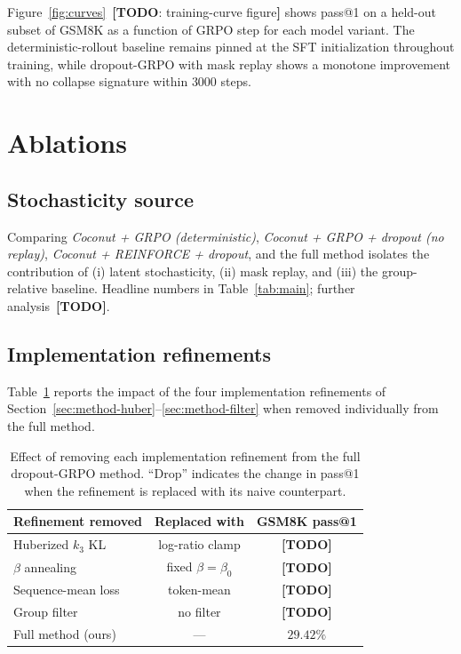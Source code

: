\documentclass[11pt]{article}
\theoremstyle{definition}
\theoremstyle{remark}
\newcommand{\answerTODO}[1][]{{\color{red}\textbf{[TODO}#1\textbf{]}}}
\begin{document}
Figure~\ref{fig:curves}~\answerTODO[: training-curve figure] shows
pass@1 on a held-out subset of \textsc{GSM8K} as a function of GRPO
step for each model variant.  The deterministic-rollout baseline
remains pinned at the SFT initialization throughout training, while
dropout-GRPO with mask replay shows a monotone improvement with no
collapse signature within $3000$ steps.

\section{Ablations}
\label{sec:ablations}

\subsection{Stochasticity source}
\label{sec:ablations-stoch}

Comparing \emph{Coconut + GRPO (deterministic)},
\emph{Coconut + GRPO + dropout (no replay)},
\emph{Coconut + REINFORCE + dropout}, and the full method isolates the
contribution of (i) latent stochasticity, (ii) mask replay, and
(iii) the group-relative baseline.  Headline numbers in
Table~\ref{tab:main}; further analysis~\answerTODO{}.

\subsection{Implementation refinements}
\label{sec:ablations-refinements}

Table~\ref{tab:refinements} reports the impact of the four
implementation refinements of Section~\ref{sec:method-huber}--\ref{sec:method-filter}
when removed individually from the full method.

\begin{table}[h]
\centering
\caption{Effect of removing each implementation refinement from the
         full dropout-GRPO method.  ``Drop'' indicates the change in
         pass@1 when the refinement is replaced with its naive
         counterpart.}
\label{tab:refinements}
\begin{tabular}{lcc}
\toprule
Refinement removed & Replaced with & GSM8K pass@1 \\
\midrule
Huberized $k_3$ KL  & log-ratio clamp           & \answerTODO{} \\
$\beta$ annealing   & fixed $\beta = \beta_0$   & \answerTODO{} \\
Sequence-mean loss  & token-mean                & \answerTODO{} \\
Group filter        & no filter                 & \answerTODO{} \\
\midrule
Full method (ours)  & ---                       & $29.42\%$ \\
\bottomrule
\end{tabular}
\end{table}
\end{document}
